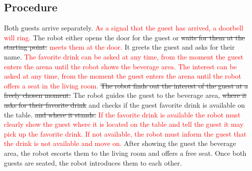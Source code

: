 \subsection*{Procedure}
Both guests arrive separately. \textcolor{red}{As a signal that the guest has arrived, a doorbell will ring.}
The robot either opens the door for the guest or \sout{waits for them at the starting point.} \textcolor{red}{meets them at the door.}
It greets the guest and asks for their name.
\textcolor{red}{The favorite drink can be asked at any time, from the moment the guest enters the arena until the robot shows the beverage area.}
\textcolor{red}{The interest can be asked at any time, from the moment the guest enters the arena until the robot offers a seat in the living room.}
\sout{The robot finds out the interest of the guest at a freely chosen moment.}
The robot guides the guest to the beverage area, \sout{where it asks for their favorite drink} and checks if the guest favorite drink is available on the table. \sout{and where it stands.}
\textcolor{red}{If the favorite drink is available the robot must clearly show the guest where it is located on the table and tell the guest it may pick up the favorite drink. If not available, the robot must inform the guest that the drink is not available and move on.}
After showing the guest the beverage area, the robot escorts them to the living room and offers a free seat. 
Once both guests are seated, the robot introduces them to each other.
